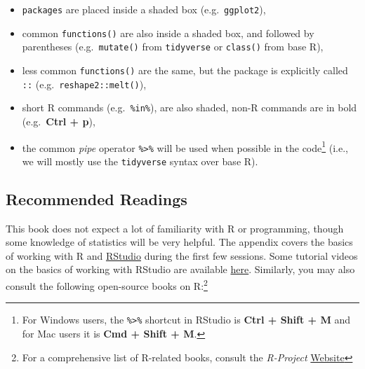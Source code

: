 \documentclass[
  letterpaper,
  DIV=11,
  numbers=noendperiod]{scrreprt}
\providecommand{\tightlist}{%
  \setlength{\itemsep}{0pt}\setlength{\parskip}{0pt}}\usepackage{longtable,booktabs,array}
\begin{document}
\begin{itemize}
\tightlist
\item
  \texttt{packages} are placed inside a shaded box
  (e.g.~\texttt{ggplot2}),
\item
  common \texttt{functions()} are also inside a shaded box, and followed
  by parentheses (e.g.~\texttt{mutate()} from \texttt{tidyverse} or
  \texttt{class()} from base R),
\item
  less common \texttt{functions()} are the same, but the package is
  explicitly called \texttt{::} (e.g.~\texttt{reshape2::melt()}),
\item
  short R commands (e.g.~\texttt{\%in\%}), are also shaded, non-R
  commands are in bold (e.g.~\textbf{Ctrl + p}),
\item
  the common \emph{pipe} operator \texttt{\%\textgreater{}\%} will be
  used when possible in the code\footnote{For Windows users, the
    \texttt{\%\textgreater{}\%} shortcut in RStudio is \textbf{Ctrl +
    Shift + M} and for Mac users it is \textbf{Cmd + Shift + M}.} (i.e.,
  we will mostly use the \texttt{tidyverse} syntax over base R).
\end{itemize}

\subsection*{Recommended Readings}\label{recommended-readings}

This book does not expect a lot of familiarity with R or programming,
though some knowledge of statistics will be very helpful. The appendix
covers the basics of working with R and
\href{https://www.rstudio.com/products/rstudio/download/}{RStudio}
during the first few sessions. Some tutorial videos on the basics of
working with RStudio are available \href{}{here}. Similarly, you may
also consult the following open-source books on R:\footnote{For a
  comprehensive list of R-related books, consult the \emph{R-Project}
  \href{https://www.r-project.org/doc/bib/R-books.html}{Website}}
\end{document}
